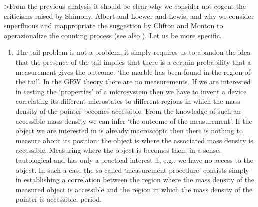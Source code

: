 \documentclass[10pt,a4paper]{article}
\begin{document}
>From the previous analysis it should be clear why we consider not
cogent the criticisms raised by Shimony, Albert and Loewer and
Lewis, and why we consider superfluous and inappropriate the
suggestion by Clifton and Monton to operazionalize the counting
process (see also \cite{bgsm1,bgsm2,bgsm3}). Let us be more
specific.
\begin{enumerate}
\item The tail problem is not a problem, it simply requires us to
abandon the idea that the presence of the tail implies that there
is a certain probability that a measurement gives the outcome:
`the marble has been found in the region of the tail'. In the GRW
theory there are no measurements. If we are interested in testing
the `properties' of a microsystem then we have to invent a device
correlating its different microstates to different regions in
which the mass density of the pointer becomes accessible. From the
knowledge of such an accessible mass density we can infer `the
outcome of the measurement'.  If the object we are interested in
is already macroscopic then there is nothing to measure about its
position: the object is where the associated mass density is
accessible. Measuring where the object is becomes then, in a
sense, tautological and has only a practical interest if, e.g., we
have no access to the object. In such a case the so called
`measurement procedure' consists simply in establishing a
correlation between the region where the mass density of the
measured object is accessible and the region in which the mass
density of the pointer is accessible, period.


\end{enumerate}
\end{document}
